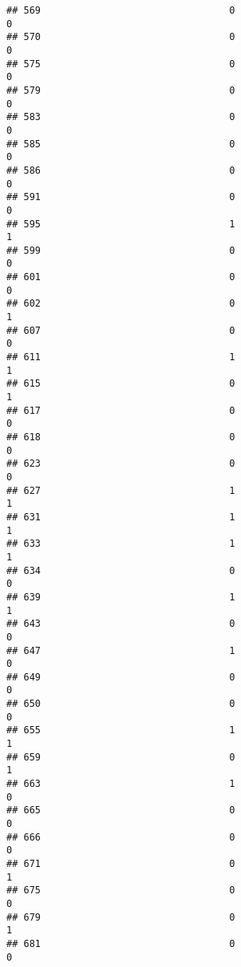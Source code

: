 \documentclass[
]{article}
\begin{document}
\begin{verbatim}
## 569                                 0                                0
## 570                                 0                                0
## 575                                 0                                0
## 579                                 0                                0
## 583                                 0                                0
## 585                                 0                                0
## 586                                 0                                0
## 591                                 0                                0
## 595                                 1                                1
## 599                                 0                                0
## 601                                 0                                0
## 602                                 0                                1
## 607                                 0                                0
## 611                                 1                                1
## 615                                 0                                1
## 617                                 0                                0
## 618                                 0                                0
## 623                                 0                                0
## 627                                 1                                1
## 631                                 1                                1
## 633                                 1                                1
## 634                                 0                                0
## 639                                 1                                1
## 643                                 0                                0
## 647                                 1                                0
## 649                                 0                                0
## 650                                 0                                0
## 655                                 1                                1
## 659                                 0                                1
## 663                                 1                                0
## 665                                 0                                0
## 666                                 0                                0
## 671                                 0                                1
## 675                                 0                                0
## 679                                 0                                1
## 681                                 0                                0

\end{verbatim}
\end{document}
